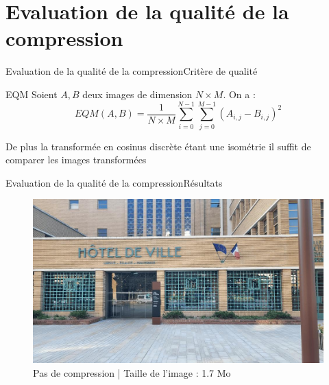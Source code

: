\section{Evaluation de la qualité de la compression}
\begin{frame}{Evaluation de la qualité de la compression}{Critère de qualité}
    \begin{block}{EQM}
        Soient \(A, B\) deux images de dimension \(N \times M\). On a :
        \[EQM(A, B) = \frac{1}{N\times M} \sum^{N-1}_{i=0}\sum^{M-1}_{j=0}(A_{i,j} - B_{i,j})^2 \] 

        De plus la transformée en cosinus discrète étant une isométrie il suffit de comparer les images transformées
    \end{block}
    
\end{frame}
    
\begin{frame}{Evaluation de la qualité de la compression}{Résultats}
    \begin{figure}
		\includegraphics[scale=0.32]{images/resultats_compression/mairie_petit.jpeg}
    \caption{Pas  de compression | Taille de l'image : 1.7 Mo}
    \end{figure}
\end{frame}

